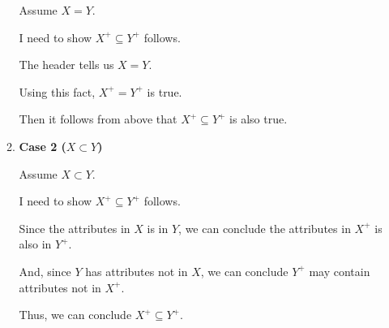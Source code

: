 \documentclass[12pt]{article}
\begin{document}
\begin{enumerate}[1.]
\begin{enumerate}[1.]
            \bigskip

            Assume $X = Y$.

            \bigskip

            I need to show $X^+ \subseteq Y^+$ follows.

            \bigskip

            The header tells us $X = Y$.

            \bigskip

            Using this fact, $X^+ = Y^+$ is true.

            \bigskip

            Then it follows from above that $X^+ \subseteq Y^+$ is also true.

            \item \textbf{Case 2 ($X \subset Y$)}

            \bigskip

            Assume $X \subset Y$.

            \bigskip

            I need to show $X^+ \subseteq Y^+$ follows.

            \bigskip

            Since the attributes in $X$ is in $Y$, we can conclude the attributes in $X^+$
            is also in $Y^+$.

            \bigskip

            And, since $Y$ has attributes not in $X$, we can conclude $Y^+$ may
            contain attributes not in $X^+$.

            \bigskip

            Thus, we can conclude $X^+ \subseteq Y^+$.

        \end{enumerate}










\end{enumerate}
\end{document}
